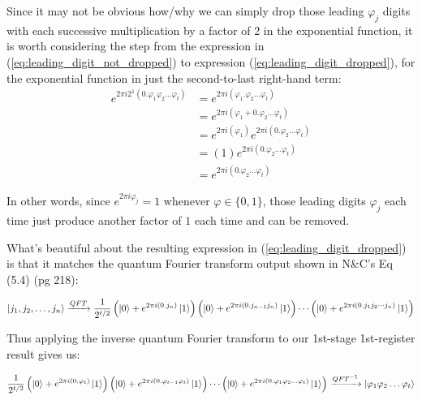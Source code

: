 \documentclass{article}
\begin{document}
\begin{enumerate}[label=\textbf{(\arabic*)}]
Since it may not be obvious how/why we can simply drop those leading $\varphi_j$ digits with each successive multiplication by a factor of 2 in the exponential function, it is worth considering the step from the expression in (\ref{eq:leading_digit_not_dropped}) to expression (\ref{eq:leading_digit_dropped}), for the exponential function in just the second-to-last right-hand term:
\begin{align}
    e^{2\pi i 2^1 (0.\varphi_{1}\varphi_2\ldots\varphi_{t})}
    &=
    e^{2\pi i (\varphi_{1}.\varphi_2\ldots\varphi_{t})}\\
    &=
    e^{2\pi i (\varphi_{1} + 0.\varphi_2\ldots\varphi_{t})}\\
    &=
    e^{2\pi i (\varphi_{1})}
    e^{2\pi i ( 0.\varphi_2\ldots\varphi_{t})}\\
    &=
    (1)
    e^{2\pi i ( 0.\varphi_2\ldots\varphi_{t})}\\
    &=
    e^{2\pi i ( 0.\varphi_2\ldots\varphi_{t})}
\end{align}

In other words, since $e^{2\pi i \varphi_j} = 1$ whenever $\varphi\in \{0, 1\}$, those leading digits $\varphi_j$ each time just produce another factor of $1$ each time and can be removed.

\vspace{0.1in}

What's beautiful about the resulting expression in (\ref{eq:leading_digit_dropped}) is that it matches the quantum Fourier transform output shown in N\&C's Eq (5.4) (pg 218):

\begin{align}
    \ket{j_1, j_2, \ldots, j_n}
    \xrightarrow{QFT}
    \frac{1}{2^{t/2}}\left(\ket{0}+e^{2\pi i (0.j_n)}\ket{1}\right)
      \left(\ket{0}+e^{2\pi i (0.j_{n-1}j_{n})}\ket{1}\right)
      \cdots
      \left(\ket{0}+e^{2\pi i (0.j_1 j_2\cdots j_{n})}\ket{1}\right)
\end{align}

Thus applying the inverse quantum Fourier transform to our 1st-stage 1st-register result gives us:

\begin{align}
    \frac{1}{2^{t/2}}\left(\ket{0}+e^{2\pi i (0.\varphi_{t})}\ket{1}\right)
      \left(\ket{0}+e^{2\pi i (0.\varphi_{t-1}\varphi_{t})}\ket{1}\right)
      \cdots
      \left(\ket{0}+e^{2\pi i (0.\varphi_1\varphi_2\ldots\varphi_{t})}\ket{1}\right)
    \xrightarrow{QFT^{-1}}
    \ket{\varphi_1\varphi_2\ldots\varphi_{t}}
\end{align}


\end{enumerate}
\end{document}
